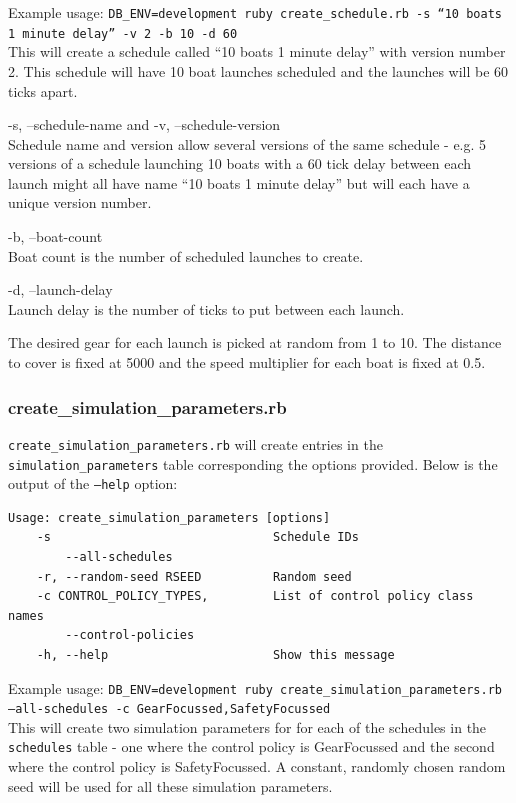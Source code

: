 Example usage: \texttt{DB\_ENV=development ruby create\_schedule.rb -s ``10 boats 1 minute delay'' -v 2 -b 10 -d 60} \\
This will create a schedule called ``10 boats 1 minute delay'' with version number 2. This schedule will have 10 boat launches scheduled and the launches will be 60 ticks apart.

\begin{description}
\item -s, --schedule-name and -v, --schedule-version\\
  Schedule name and version allow several versions of the same schedule - e.g. 5 versions of a schedule launching 10 boats with a 60 tick delay between each launch might all have name ``10 boats 1 minute delay'' but will each have a unique version number.

\item -b, --boat-count\\
  Boat count is the number of scheduled launches to create.
  
\item -d, --launch-delay\\  
  Launch delay is the number of ticks to put between each launch.
\end{description}
The desired gear for each launch is picked at random from 1 to 10. The distance to cover is fixed at 5000 and the speed multiplier for each boat is fixed at 0.5.

\subsubsection{create\_simulation\_parameters.rb}

\texttt{create\_simulation\_parameters.rb} will create entries in the \texttt{simulation\_parameters} table corresponding the options provided. Below is the output of the \texttt{--help} option:

\begin{lstlisting}[basicstyle=\ttfamily]
Usage: create_simulation_parameters [options]
    -s                               Schedule IDs
        --all-schedules
    -r, --random-seed RSEED          Random seed
    -c CONTROL_POLICY_TYPES,         List of control policy class names
        --control-policies
    -h, --help                       Show this message
\end{lstlisting}

Example usage: \texttt{DB\_ENV=development ruby create\_simulation\_parameters.rb --all-schedules -c GearFocussed,SafetyFocussed} \\
This will create two simulation parameters for for each of the schedules in the \texttt{schedules} table - one where the control policy is GearFocussed and the second where the control policy is SafetyFocussed. A constant, randomly chosen random seed will be used for all these simulation parameters.

